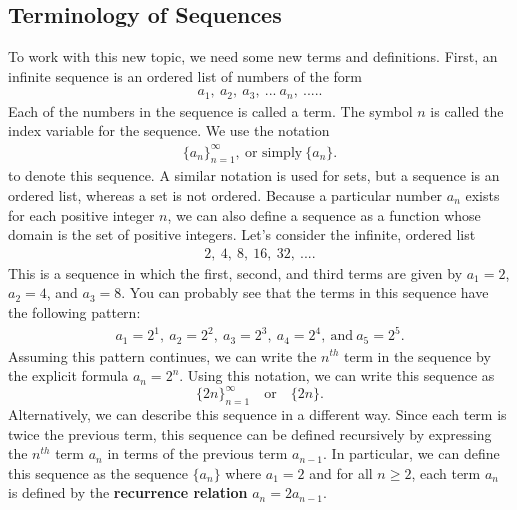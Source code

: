 \documentclass{report}
\begin{document}
    \subsection*{Terminology of Sequences}
    \bigbreak \noindent 
    To work with this new topic, we need some new terms and definitions. First, an infinite sequence is an ordered list of numbers of the form
    \begin{align*}
        a_{1},\ a_{2},\ a_{3},\ ...\ a_{n},\ ....
    .\end{align*}
    \bigbreak \noindent 
    Each of the numbers in the sequence is called a term. The symbol $n$ is called the index variable for the sequence. We use the notation
    \begin{align*}
        \{a_{n}\}_{n=1}^{\infty},\ \text{or simply}\ \{a_{n}\}
    .\end{align*}
    \bigbreak \noindent 
    to denote this sequence. A similar notation is used for sets, but a sequence is an ordered list, whereas a set is not ordered. Because a particular number $a_{n}$ exists for each positive integer $n$, we can also define a sequence as a function whose domain is the set of positive integers.
     \bigbreak \noindent 
    Let’s consider the infinite, ordered list
    \begin{align*}
        2,\ 4,\ 8,\ 16,\ 32,\ ...
    .\end{align*}
    \bigbreak \noindent 
    This is a sequence in which the first, second, and third terms are given by $a_1 = 2$, $a_2 = 4$, and $a_3 = 8$. You can probably see that the terms in this sequence have the following pattern:
    \begin{align*}
        a_{1} = 2^{1},\ a_{2} = 2^{2},\ a_{3} = 2^{3},\ a_{4}= 2^{4},\ \text{and}\ a_{5} = 2^{5}
    .\end{align*}
    \bigbreak \noindent 
    Assuming this pattern continues, we can write the $n^{th}$ term in the sequence by the explicit formula $a_n = 2^{n}$. Using this notation, we can write this sequence as
    \[
    \{2n\}_{n=1}^{\infty} \quad \text{or} \quad \{2n\}.
    \]
    \bigbreak \noindent 
    Alternatively, we can describe this sequence in a different way. Since each term is twice the previous term, this sequence can be defined recursively by expressing the $n^{th}$ term $a_n$ in terms of the previous term $a_{n-1}$. In particular, we can define this sequence as the sequence $\{a_n\}$ where $a_1=2$ and for all $n \geq 2$, each term $a_n$ is defined by the \textbf{recurrence relation} $a_n = 2a_{n-1}$.
\end{document}
